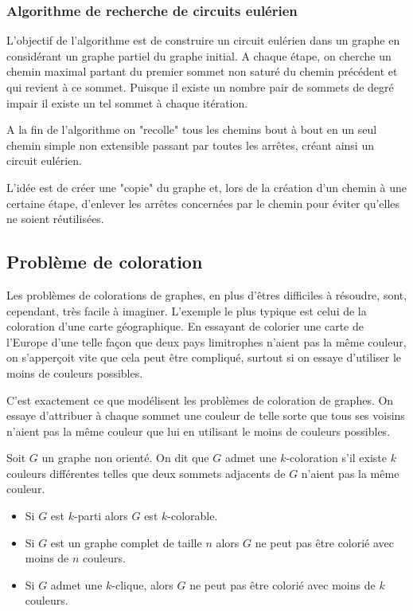 \subsubsection{Algorithme de recherche de circuits eulérien}

L'objectif de l'algorithme est de construire un circuit eulérien dans un graphe en considérant un graphe partiel
du graphe initial. A chaque étape, on cherche un chemin maximal partant du premier sommet non saturé du chemin précédent
et qui revient à ce sommet. Puisque il existe un nombre pair de sommets de degré impair il existe un tel sommet à chaque itération. 

A la fin de l'algorithme on "recolle" tous les chemins bout à bout en un seul chemin simple non extensible passant par toutes 
les arrêtes, créant ainsi un circuit eulérien. 

L'idée est de créer une "copie" du graphe et, lors de la création d'un chemin à une certaine étape, d'enlever les arrêtes concernées
par le chemin pour éviter qu'elles ne soient réutilisées. 


\subsection{Problème de coloration}

Les problèmes de colorations de graphes, en plus d'êtres difficiles à résoudre, sont, cependant, très facile à imaginer. 
L'exemple le plus typique est celui de la coloration d'une carte géographique. En essayant de colorier une carte de l'Europe
d'une telle façon que deux pays limitrophes n'aient pas la même couleur, on s'apperçoit vite que cela peut être compliqué, 
surtout si on essaye d'utiliser le moins de couleurs possibles.

C'est exactement ce que modélisent les problèmes de coloration de graphes. On essaye d'attribuer à chaque sommet une couleur
de telle sorte que tous ses voisins n'aient pas la même couleur que lui en utilisant le moins de couleurs possibles. 

\begin{definition}[$k$-coloration]
    Soit $G$ un graphe non orienté. On dit que $G$ admet une $k$-coloration s'il existe $k$ couleurs différentes 
    telles que deux sommets adjacents de $G$ n'aient pas la même couleur. 
\end{definition}

\begin{prop}
    \begin{itemize}
        \item Si $G$ est $k$-parti alors $G$ est $k$-colorable. 
        \item Si $G$ est un graphe complet de taille $n$ alors $G$ ne peut pas être colorié avec moins de $n$ couleurs. 
        \item Si $G$ admet une $k$-clique, alors $G$ ne peut pas être colorié avec moins de $k$ couleurs.
    \end{itemize}
\end{prop}

